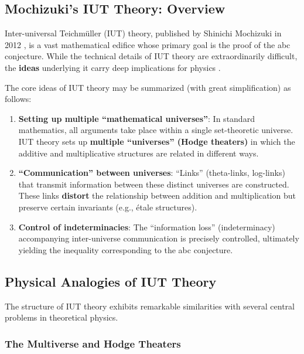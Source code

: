 \documentclass[12pt,a4paper]{article}
\theoremstyle{definition}
\begin{document}
\subsection{Mochizuki's IUT Theory: Overview}

Inter-universal Teichm\"{u}ller (IUT) theory, published by Shinichi Mochizuki in 2012 \cite{Mochizuki2012a, Mochizuki2012b, Mochizuki2012c, Mochizuki2012d}, is a vast mathematical edifice whose primary goal is the proof of the abc conjecture. While the technical details of IUT theory are extraordinarily difficult, the \textbf{ideas} underlying it carry deep implications for physics \cite{Fesenko2015, Fesenko2016}.

The core ideas of IUT theory may be summarized (with great simplification) as follows:

\begin{enumerate}[leftmargin=2em]
  \item \textbf{Setting up multiple ``mathematical universes''}: In standard mathematics, all arguments take place within a single set-theoretic universe. IUT theory sets up \textbf{multiple ``universes'' (Hodge theaters)} in which the additive and multiplicative structures are related in different ways.
  \item \textbf{``Communication'' between universes}: ``Links'' (theta-links, log-links) that transmit information between these distinct universes are constructed. These links \textbf{distort} the relationship between addition and multiplication but preserve certain invariants (e.g., \'etale structures).
  \item \textbf{Control of indeterminacies}: The ``information loss'' (indeterminacy) accompanying inter-universe communication is precisely controlled, ultimately yielding the inequality corresponding to the abc conjecture.
\end{enumerate}

\subsection{Physical Analogies of IUT Theory}

The structure of IUT theory exhibits remarkable similarities with several central problems in theoretical physics.

\subsubsection{The Multiverse and Hodge Theaters}
\end{document}
